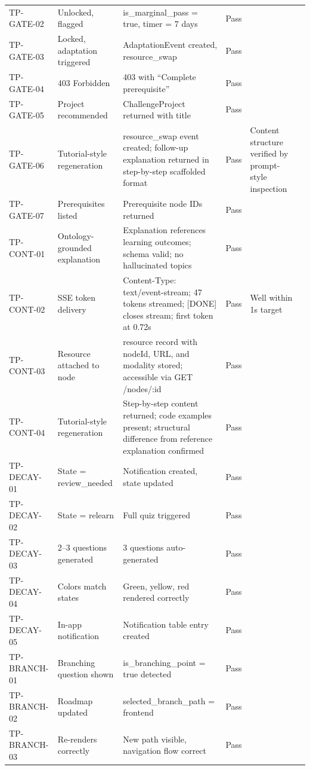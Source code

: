 \begin{longtable}{p{1.8cm}p{2.5cm}p{2.5cm}p{3cm}p{1.2cm}p{2.5cm}}
TP-GATE-02 & Unlocked, flagged & is\_marginal\_pass = true, timer = 7 days & Pass & \\
TP-GATE-03 & Locked, adaptation triggered & AdaptationEvent created, resource\_swap & Pass & \\
TP-GATE-04 & 403 Forbidden & 403 with ``Complete prerequisite'' & Pass & \\
TP-GATE-05 & Project recommended & ChallengeProject returned with title & Pass & \\
TP-GATE-06 & Tutorial-style regeneration & resource\_swap event created; follow-up explanation returned in step-by-step scaffolded format & Pass & Content structure verified by prompt-style inspection \\
TP-GATE-07 & Prerequisites listed & Prerequisite node IDs returned & Pass & \\
TP-CONT-01 & Ontology-grounded explanation & Explanation references learning outcomes; schema valid; no hallucinated topics & Pass & \\
TP-CONT-02 & SSE token delivery & Content-Type: text/event-stream; 47 tokens streamed; [DONE] closes stream; first token at 0.72s & Pass & Well within 1s target \\
TP-CONT-03 & Resource attached to node & resource record with nodeId, URL, and modality stored; accessible via GET /nodes/:id & Pass & \\
TP-CONT-04 & Tutorial-style regeneration & Step-by-step content returned; code examples present; structural difference from reference explanation confirmed & Pass & \\
TP-DECAY-01 & State = review\_needed & Notification created, state updated & Pass & \\
TP-DECAY-02 & State = relearn & Full quiz triggered & Pass & \\
TP-DECAY-03 & 2--3 questions generated & 3 questions auto-generated & Pass & \\
TP-DECAY-04 & Colors match states & Green, yellow, red rendered correctly & Pass & \\
TP-DECAY-05 & In-app notification & Notification table entry created & Pass & \\
TP-BRANCH-01 & Branching question shown & is\_branching\_point = true detected & Pass & \\
TP-BRANCH-02 & Roadmap updated & selected\_branch\_path = frontend & Pass & \\
TP-BRANCH-03 & Re-renders correctly & New path visible, navigation flow correct & Pass & \\

\end{longtable}
